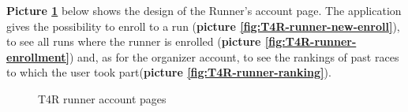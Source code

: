 \textbf{Picture \ref{fig:T4R-runner-account}} below shows the design of the Runner's account page.
The application gives the possibility to enroll to a run (\textbf{picture \ref{fig:T4R-runner-new-enroll}}), to see all runs where the runner is enrolled (\textbf{picture \ref{fig:T4R-runner-enrollment}}) and, as for the organizer account, to see the rankings of past races to which the user took part(\textbf{picture \ref{fig:T4R-runner-ranking}}).

\begin{figure}[H]
  \centering
  \caption{T4R runner account pages}
  \label{fig:T4R-runner-account}
\end{figure}

